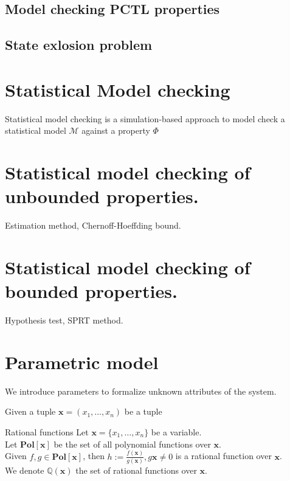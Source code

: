 \subsection{Model checking PCTL properties}

\subsection{State exlosion problem}


\section{Statistical Model checking}
Statistical model checking is a simulation-based approach to model check a statistical model
$\mathcal{M}$ against a property $\Phi$
\section{Statistical model checking of unbounded properties.}
Estimation method, Chernoff-Hoeffding bound.


\section{Statistical model checking of bounded properties.}
Hypothesis test,     SPRT method.

\section{Parametric model}
We introduce parameters to formalize unknown attributes of the system.
\begin{definition}
    Given a tuple $\mathbf{x}=(x_1,\ldots,x_n)$ be a tuple
\end{definition}

\begin{definition}{Rational functions}
    Let $\mathbf{x}=\{x_1,\ldots,x_n\}$ be a variable.\\
    Let $\mathbf{Pol}[\mathbf{x}]$ be the set of all polynomial functions over $\mathbf{x}$.\\
    Given $f,g\in\mathbf{Pol}[\mathbf{x}]$, then $h:=\frac{f(\mathbf{x})}{g(\mathbf{x})},
        g{\mathbf{x}}\neq 0$ is a rational function over $\mathbf{x}$.\\
    We denote $\mathbb{Q}(\mathbf{x})$ the set of rational functions over $\mathbf{x}$.
\end{definition}


